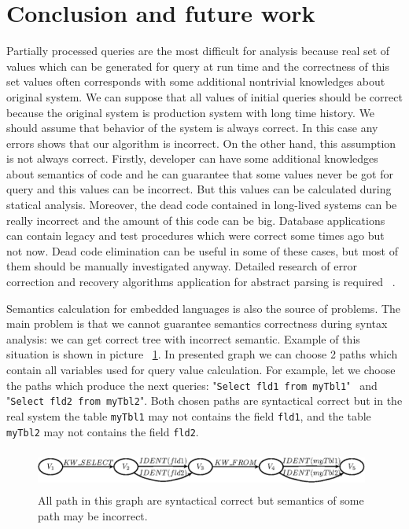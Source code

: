 \section{Conclusion and future work}
\label{sec:Conclusion}

Partially processed queries are the most difficult for analysis because real set of values which can be 
generated for query at run time and the correctness of this set values often corresponds with some 
additional nontrivial knowledges about original system. We can suppose that all values of initial 
queries should be correct because the original system is production system with long time history. 
We should assume that behavior of the system is always correct. In this case any errors shows that 
our algorithm is incorrect. On the other hand, this assumption is not always correct. Firstly, developer 
can have some additional knowledges about semantics of code and he can guarantee that some values never 
be got for query and this values can be incorrect. But this values can be calculated during statical 
analysis. Moreover, the dead code contained in long-lived systems can be really incorrect and the amount 
of this code can be big. Database applications can contain legacy and test procedures which were correct 
some times ago but not now. Dead code elimination can be useful in some of these cases, but most of 
them should be manually investigated anyway. Detailed research of error correction and recovery 
algorithms application for abstract parsing is required ~\cite{RelaxedLALR}.

 
Semantics calculation for embedded languages is also the source of problems. The main problem is 
that we cannot guarantee semantics correctness during syntax analysis: we can get correct tree 
with incorrect semantic. Example of this situation is shown in picture ~\ref{pic7}. In presented 
graph we can choose 2 paths which contain all variables used for query value calculation. For 
example, let we choose the paths which produce the next queries: "\verb|Select fld1 from myTbl1|" \ and "\verb|Select fld2 from myTbl2|". 
Both chosen paths are syntactical correct but in the real system the table \verb|myTbl1| may not contains 
the field \verb|fld1|, and the table  \verb|myTbl2| may not contains the field \verb|fld2|.  

\begin{figure}
    \begin{center}
        \includegraphics[width=11cm,height=1.3cm]{graphs/semantics_example.eps}
        \caption{ All path in this graph are syntactical correct but semantics of some path may be incorrect.}
        \label{pic7}
    \end{center}
\end{figure}


